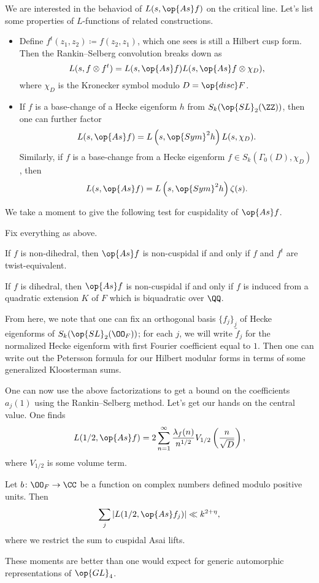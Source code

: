 \documentclass{article}
\begin{document}
We are interested in the behaviod of $L(s,\op{As}f)$ on the critical line. Let's list some properties of $L$-func\-tions of related constructions.
\begin{itemize}
	\item Define $f^t(z_1,z_2)\coloneqq f(z_2,z_1)$, which one sees is still a Hilbert cusp form. Then the Rankin--Selberg convolution breaks down as
	\[L(s,f\otimes f^t)=L(s,\op{As}f)L(s,\op{As}f\otimes\chi_D),\]
	where $\chi_D$ is the Kronecker symbol modulo $D=\op{disc}F$.
	\item If $f$ is a base-change of a Hecke eigenform $h$ from $S_k(\op{SL}_2(\ZZ))$, then one can further factor
	\[L(s,\op{As}f)=L\left(s,\op{Sym}^2h\right)L(s,\chi_D).\]
	Similarly, if $f$ is a base-change from a Hecke eigenform $f\in S_k(\Gamma_0(D),\chi_D)$, then
	\[L(s,\op{As}f)=L\left(s,\op{Sym}^2h\right)\zeta(s).\]
\end{itemize}
We take a moment to give the following test for cuspidality of $\op{As}f$.
\begin{theorem}
	Fix everything as above.
	\begin{listalph}
		\item If $f$ is non-dihedral, then $\op{As}f$ is non-cuspidal if and only if $f$ and $f^t$ are twist-equivalent.
		\item If $f$ is dihedral, then $\op{As}f$ is non-cuspidal if and only if $f$ is induced from a quadratic extension $K$ of $F$ which is biquadratic over $\QQ$.
	\end{listalph}
\end{theorem}
From here, we note that one can fix an orthogonal basis $\{f_j\}_j$ of Hecke eigenforms of $S_k(\op{SL}_2(\OO_F))$; for each $j$, we will write $\widetilde f_j$ for the normalized Hecke eigenform with first Fourier coefficient equal to $1$. Then one can write out the Petersson formula for our Hilbert modular forms in terms of some generalized Kloosterman sums.

One can now use the above factorizations to get a bound on the coefficients $a_j(1)$ using the Rankin--Selberg method. Let's get our hands on the central value. One finds
\[L(1/2,\op{As}f)=2\sum_{n=1}^\infty\frac{\lambda_f(n)}{n^{1/2}}V_{1/2}\left(\frac n{\sqrt D}\right),\]
where $V_{1/2}$ is some volume term.
\begin{theorem}
	Let $b\colon\OO_F\to\CC$ be a function on complex numbers defined modulo positive units. Then
	\[\sum_{j}\left|L(1/2,\op{As}f_j)\right|\ll k^{2+\eta},\]
	where we restrict the sum to cuspidal Asai lifts.
\end{theorem}
These moments are better than one would expect for generic automorphic representations of $\op{GL}_4$.
\end{document}
